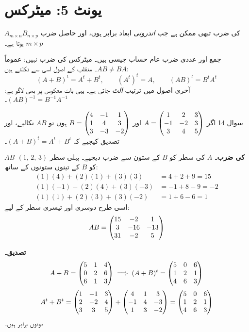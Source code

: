 
\section*{یونٹ \textenglish{5}: میٹرکس}

\begin{nukta}
\(A_{m\times n}B_{n\times p}\) کی ضرب تبھی ممکن ہے جب \emph{اندرونی} ابعاد
برابر ہوں، اور حاصل ضرب \(m\times p\) ہوتا ہے۔

\medskip
جمع اور عددی ضرب عام حساب جیسی ہیں۔ میٹرکس کی ضرب نہیں: عموماً
\(AB\neq BA\)۔ منقلب کے اصول اسی سے نکلتے ہیں:
\[
(A+B)^{t}=A^{t}+B^{t},\qquad (A^{t})^{t}=A,\qquad
\boxed{(AB)^{t}=B^{t}A^{t}}
\]
آخری اصول میں ترتیب \emph{الٹ} جاتی ہے۔ یہی بات معکوس پر بھی لاگو ہے:
\((AB)^{-1}=B^{-1}A^{-1}\)۔
\end{nukta}

\begin{sawal}{سوال \textenglish{14}}
اگر \(A=\begin{pmatrix}1&2&3\\-1&-2&3\\3&4&5\end{pmatrix}\) اور \(B=\begin{pmatrix}4&-1&1\\1&4&3\\3&-3&-2\end{pmatrix}\)
ہوں تو \(AB\) نکالیے، اور تصدیق کیجیے کہ \((A+B)^{t}=A^{t}+B^{t}\)۔
\end{sawal}

\begin{hal}
\textbf{\(AB\) کی ضرب۔} \(A\) کی سطر کو \(B\) کے ستون سے ضرب دیجیے۔ پہلی سطر
\((1,\,2,\,3)\) کو \(B\) کے تینوں ستونوں کے ساتھ:
\[
\begin{aligned}
(1)(4)+(2)(1)+(3)(3)&=4+2+9=15\\
(1)(-1)+(2)(4)+(3)(-3)&=-1+8-9=-2\\
(1)(1)+(2)(3)+(3)(-2)&=1+6-6=1
\end{aligned}
\]
اسی طرح دوسری اور تیسری سطر کے لیے:
\[
AB=\begin{pmatrix}15&-2&1\\3&-16&-13\\31&-2&5\end{pmatrix}
\]

\medskip
\textbf{تصدیق۔}
\[
A+B=\begin{pmatrix}5&1&4\\0&2&6\\6&1&3\end{pmatrix}
\;\Longrightarrow\;
(A+B)^{t}=\begin{pmatrix}5&0&6\\1&2&1\\4&6&3\end{pmatrix}
\]
\[
A^{t}+B^{t}=\begin{pmatrix}1&-1&3\\2&-2&4\\3&3&5\end{pmatrix}+\begin{pmatrix}4&1&3\\-1&4&-3\\1&3&-2\end{pmatrix}
=\begin{pmatrix}5&0&6\\1&2&1\\4&6&3\end{pmatrix}
\]
دونوں برابر ہیں۔

\end{hal}

